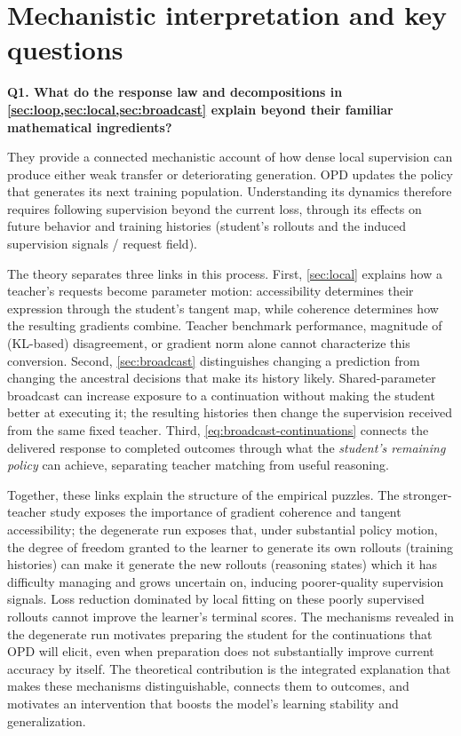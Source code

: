 \section{Mechanistic interpretation and key questions}
\label{app:clarifications}

\noindent\textbf{Q1. What do the response law and decompositions in \cref{sec:loop,sec:local,sec:broadcast} explain beyond their familiar mathematical ingredients?}
\par\noindent
They provide a connected mechanistic account of how dense local supervision can produce either weak transfer or deteriorating generation. OPD updates the policy that generates its next training population. Understanding its dynamics therefore requires following supervision beyond the current loss, through its effects on future behavior and training histories (student's rollouts and the induced supervision signals / request field).

The theory separates three links in this process. First, \cref{sec:local} explains how a teacher's requests become parameter motion: accessibility determines their expression through the student's tangent map, while coherence determines how the resulting gradients combine. Teacher benchmark performance, magnitude of (KL-based) disagreement, or gradient norm alone cannot characterize this conversion. Second, \cref{sec:broadcast} distinguishes changing a prediction from changing the ancestral decisions that make its history likely. Shared-parameter broadcast can increase exposure to a continuation without making the student better at executing it; the resulting histories then change the supervision received from the same fixed teacher. Third, \cref{eq:broadcast-continuations} connects the delivered response to completed outcomes through what the \emph{student's remaining policy} can achieve, separating teacher matching from useful reasoning.

Together, these links explain the structure of the empirical puzzles. The stronger-teacher study exposes the importance of gradient coherence and tangent accessibility; the degenerate run exposes that, under substantial policy motion, the degree of freedom granted to the learner to generate its own rollouts (training histories) can make it generate the new rollouts (reasoning states) which it has difficulty managing and grows uncertain on, inducing poorer-quality supervision signals. Loss reduction dominated by local fitting on these poorly supervised rollouts cannot improve the learner's terminal scores. The mechanisms revealed in the degenerate run motivates preparing the student for the continuations that OPD will elicit, even when preparation does not substantially improve current accuracy by itself. The theoretical contribution is the integrated explanation that makes these mechanisms distinguishable, connects them to outcomes, and motivates an intervention that boosts the model's learning stability and generalization.

